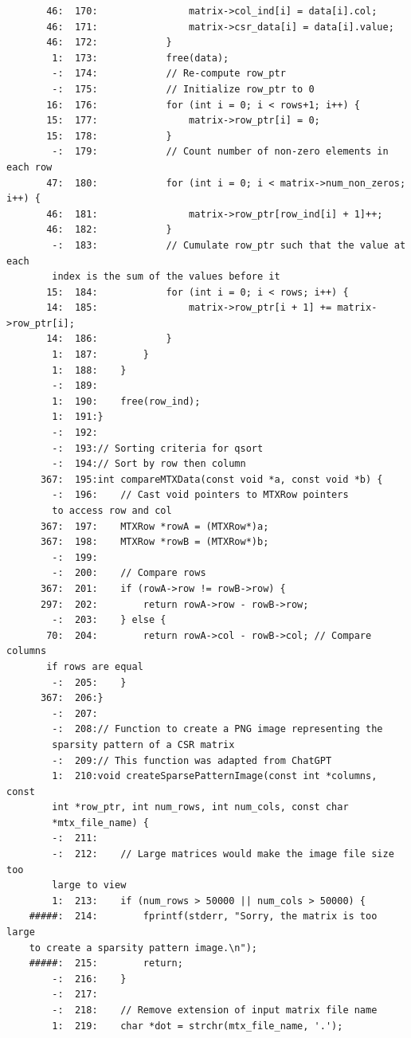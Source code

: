 \documentclass[12pt]{article}
\begin{document}
\begin{mdframed}[style=myboxstyleTerminal1]
\begin{verbatim}
       46:  170:                matrix->col_ind[i] = data[i].col;
       46:  171:                matrix->csr_data[i] = data[i].value;
       46:  172:            }
        1:  173:            free(data);
        -:  174:            // Re-compute row_ptr
        -:  175:            // Initialize row_ptr to 0
       16:  176:            for (int i = 0; i < rows+1; i++) {
       15:  177:                matrix->row_ptr[i] = 0;
       15:  178:            }
        -:  179:            // Count number of non-zero elements in each row
       47:  180:            for (int i = 0; i < matrix->num_non_zeros; i++) {
       46:  181:                matrix->row_ptr[row_ind[i] + 1]++;
       46:  182:            }
        -:  183:            // Cumulate row_ptr such that the value at each
        index is the sum of the values before it
       15:  184:            for (int i = 0; i < rows; i++) {
       14:  185:                matrix->row_ptr[i + 1] += matrix->row_ptr[i];
       14:  186:            }
        1:  187:        }
        1:  188:    }
        -:  189:
        1:  190:    free(row_ind);
        1:  191:}
        -:  192:
        -:  193:// Sorting criteria for qsort
        -:  194:// Sort by row then column
      367:  195:int compareMTXData(const void *a, const void *b) {
        -:  196:    // Cast void pointers to MTXRow pointers 
        to access row and col
      367:  197:    MTXRow *rowA = (MTXRow*)a;
      367:  198:    MTXRow *rowB = (MTXRow*)b;
        -:  199:
        -:  200:    // Compare rows
      367:  201:    if (rowA->row != rowB->row) {
      297:  202:        return rowA->row - rowB->row;
        -:  203:    } else {
       70:  204:        return rowA->col - rowB->col; // Compare columns 
       if rows are equal
        -:  205:    }
      367:  206:}
        -:  207:
        -:  208:// Function to create a PNG image representing the 
        sparsity pattern of a CSR matrix
        -:  209:// This function was adapted from ChatGPT
        1:  210:void createSparsePatternImage(const int *columns, const 
        int *row_ptr, int num_rows, int num_cols, const char 
        *mtx_file_name) {
        -:  211:
        -:  212:    // Large matrices would make the image file size too 
        large to view
        1:  213:    if (num_rows > 50000 || num_cols > 50000) {
    #####:  214:        fprintf(stderr, "Sorry, the matrix is too large 
    to create a sparsity pattern image.\n");
    #####:  215:        return;
        -:  216:    }
        -:  217:
        -:  218:    // Remove extension of input matrix file name
        1:  219:    char *dot = strchr(mtx_file_name, '.');

\end{verbatim}
\end{mdframed}
\end{document}
